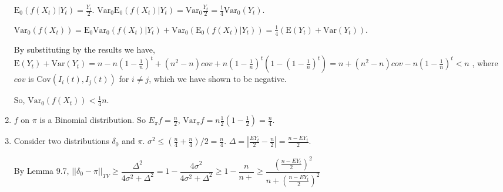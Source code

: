 \documentclass[10pt]{article}
\newcommand{\Cov}{\mathrm{Cov}}
\newcommand{\E}{\mathrm{E}}
\newcommand{\Var}{\mathrm{Var}}
\begin{document}
\begin{enumerate}
$\E_0(f(X_t) | Y_t) = \frac{Y_t}{2}$.
$\Var_0 \E_0(f(X_t) | Y_t) = \Var_0 \frac{Y_t}{2} = \frac{1}{4} \Var_0 (Y_t)$.

$\Var_0(f(X_t)) = \E_0 \Var_0(f(X_t) | Y_t) + \Var_0 (\E_0(f(X_t) | Y_t)) =
\frac{1}{4} (\E (Y_t) + \Var (Y_t))$.

By substituting by the results we have,
$\E (Y_t) + \Var (Y_t)
= n - n(1 - \frac{1}{n})^t + (n^2 - n) cov + n (1 - \frac{1}{n})^t (1 - (1 -
\frac{1}{n})^t)
= n + (n^2 - n) cov - n (1 - \frac{1}{n})^t
< n
$
, where $cov$ is $\Cov(I_i(t), I_j(t))$ for $i \neq j$, which we have shown to
be negative.

So, $\Var_0(f(X_t)) < \frac{1}{4} n$.

\item $f$ on $\pi$ is a Binomial distribution. So $E_\pi f = \frac{n}{2}$,
$\Var_\pi f = n \frac{1}{2} (1 - \frac{1}{2}) = \frac{n}{4}$.

\item Consider two distributions $\delta_0$ and $\pi$.
$\sigma^2 \leq (\frac{n}{4} + \frac{n}{4}) / 2 = \frac{n}{4}$.
$\Delta = |\frac{EY_t}{2} - \frac{n}{2}| = \frac{n - EY_t}{2}$.

By Lemma 9.7, 
$||\delta_0 - \pi||_{TV}
\geq \dfrac{\Delta^2}{4 \sigma^2 + \Delta^2}
= 1 - \dfrac{4 \sigma^2}{4 \sigma^2 + \Delta^2}
\geq 1 - \dfrac{n}{n + }
\geq \dfrac{(\frac{n - EY_t}{2})^2}{n + (\frac{n - EY_t}{2})^2}
$

\end{enumerate}
\end{document}
